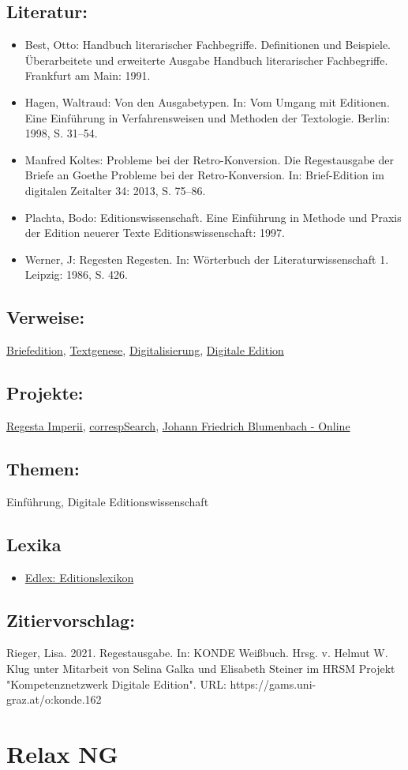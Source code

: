 \documentclass{article}
\begin{document}
        \subsection*{Literatur:}\begin{itemize}\item Best, Otto: Handbuch literarischer Fachbegriffe. Definitionen und Beispiele. Überarbeitete und erweiterte Ausgabe Handbuch literarischer Fachbegriffe. Frankfurt am Main: 1991.\item Hagen, Waltraud: Von den Ausgabetypen. In: Vom Umgang mit Editionen. Eine Einführung in Verfahrensweisen und Methoden der Textologie. Berlin: 1998, S. 31–54.\item Manfred Koltes: Probleme bei der Retro-Konversion. Die Regestausgabe der Briefe an Goethe Probleme bei der Retro-Konversion. In: Brief-Edition im digitalen Zeitalter 34: 2013, S. 75–86.\item Plachta, Bodo: Editionswissenschaft. Eine Einführung in Methode und Praxis der Edition neuerer Texte Editionswissenschaft: 1997.\item Werner, J: Regesten Regesten. In: Wörterbuch der Literaturwissenschaft 1. Leipzig: 1986, S. 426.\end{itemize}\subsection*{Verweise:}\href{https://gams.uni-graz.at/o:konde.39}{Briefedition}, \href{https://gams.uni-graz.at/o:konde.28}{Textgenese}, \href{https://gams.uni-graz.at/o:konde.60}{Digitalisierung}, \href{https://gams.uni-graz.at/o:konde.59}{Digitale Edition}\subsection*{Projekte:}\href{http://www.regesta-imperii.de/unternehmen/ri-online.html}{Regesta Imperii}, \href{https://correspsearch.net}{correspSearch}, \href{http://www.blumenbach-online.de}{Johann Friedrich Blumenbach - Online}\subsection*{Themen:}Einführung, Digitale Editionswissenschaft\subsection*{Lexika}\begin{itemize}\item \href{https://edlex.de/index.php?title=Regestausgabe}{Edlex: Editionslexikon}\end{itemize}\subsection*{Zitiervorschlag:}Rieger, Lisa. 2021. Regestausgabe. In: KONDE Weißbuch. Hrsg. v. Helmut W. Klug unter Mitarbeit von Selina Galka und Elisabeth Steiner im HRSM Projekt "Kompetenznetzwerk Digitale Edition". URL: https://gams.uni-graz.at/o:konde.162\newpage\section*{Relax NG} 
\end{document}
